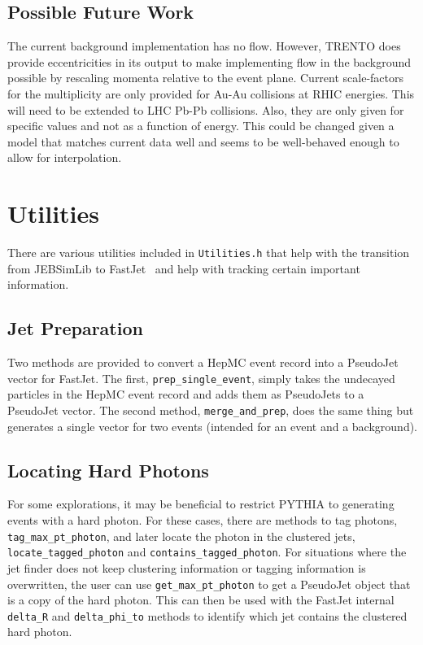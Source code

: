\documentclass[11pt]{article}
\begin{document}
\subsection{Possible Future Work}
The current background implementation has no flow. However, TRENTO does provide eccentricities in its output to make implementing flow in the background possible by rescaling momenta relative to the event plane. Current scale-factors for the multiplicity are only provided for Au-Au collisions at RHIC energies. This will need to be extended to LHC Pb-Pb collisions. Also, they are only given for specific values and not as a function of energy. This could be changed given a model that matches current data well and seems to be well-behaved enough to allow for interpolation.

\section{Utilities}
There are various utilities included in \texttt{Utilities.h} that help with the transition from JEBSimLib to FastJet~\cite{Cacciari:2011ma} and help with tracking certain important information.

\subsection{Jet Preparation}
Two methods are provided to convert a HepMC event record into a PseudoJet vector for FastJet. The first, \texttt{prep\_single\_event}, simply takes the undecayed particles in the HepMC event record and adds them as PseudoJets to a PseudoJet vector. The second method, \texttt{merge\_and\_prep}, does the same thing but generates a single vector for two events (intended for an event and a background).

\subsection{Locating Hard Photons}
For some explorations, it may be beneficial to restrict PYTHIA to generating events with a hard photon. For these cases, there are methods to tag photons, \texttt{tag\_max\_pt\_photon}, and later locate the photon in the clustered jets, \texttt{locate\_tagged\_photon} and \texttt{contains\_tagged\_photon}. For situations where the jet finder does not keep clustering information or tagging information is overwritten, the user can use \texttt{get\_max\_pt\_photon} to get a PseudoJet object that is a copy of the hard photon. This can then be used with the FastJet internal \texttt{delta\_R} and \texttt{delta\_phi\_to} methods to identify which jet contains the clustered hard photon.
\end{document}
